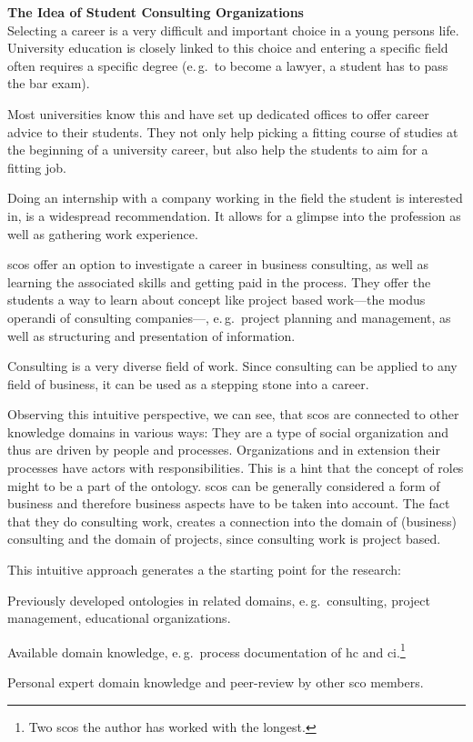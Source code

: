\documentclass[a4paper, DIV=13, BCOR=0cm]{scrbook}
\newcommand{\eg}{e.\,g.\ }
\begin{document}
\begin{mdframed}
	\textbf{The Idea of Student Consulting Organizations}\\
	Selecting a career is a very difficult and important choice in a young persons life. University education is closely linked to this choice and entering a specific field often requires a specific degree (\eg to become a lawyer, a student has to pass the bar exam).

	Most universities know this and have set up dedicated offices to offer career advice to their students. They not only help picking a fitting course of studies at the beginning of a university career, but also help the students to aim for a fitting job.

	Doing an internship with a company working in the field the student is interested in, is a widespread recommendation. It allows for a glimpse into the profession as well as gathering work experience.

	\glspl{sco} offer an option to investigate a career in business consulting, as well as learning the associated skills and getting paid in the process. They offer the students a way to learn about concept like project based work---the modus operandi of consulting companies---, \eg project planning and management, as well as structuring and presentation of information.

	Consulting is a very diverse field of work. Since consulting can be applied to any field of business, it can be used as a stepping stone into a career.
\end{mdframed}

Observing this intuitive perspective, we can see, that \glspl{sco} are connected to other knowledge domains in various ways: They are a type of social organization and thus are driven by people and processes. Organizations and in extension their processes have actors with responsibilities. This is a hint that the concept of roles might to be a part of the ontology. \glspl{sco} can be generally considered a form of business and therefore business aspects have to be taken into account. The fact that they do consulting work, creates a connection into the domain of (business) consulting and the domain of projects, since consulting work is project based.

This intuitive approach generates a the starting point for the research:
\begin{compactitem}
	\item Previously developed ontologies in related domains, \eg consulting, project management, educational organizations.
	\item Available domain knowledge, \eg process documentation of \gls{hc} and \gls{ci}.\footnote{Two \glspl{sco} the author has worked with the longest.}
	\item Personal expert domain knowledge and peer-review by other \gls{sco} members.
\end{compactitem}
\end{document}
